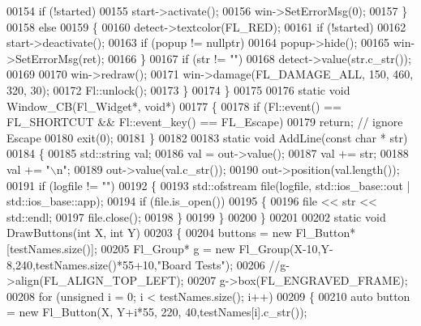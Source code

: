 \begin{DoxyCode}
00154             \textcolor{keywordflow}{if} (!started)
00155                 start->activate();
00156             win->SetErrorMsg(0);
00157         \}
00158         \textcolor{keywordflow}{else}
00159         \{
00160             detect->textcolor(FL\_RED);
00161             \textcolor{keywordflow}{if} (!started)
00162                 start->deactivate();
00163             \textcolor{keywordflow}{if} (popup != \textcolor{keyword}{nullptr})
00164                 popup->hide();
00165             win->SetErrorMsg(ret);
00166         \}
00167         \textcolor{keywordflow}{if} (str != \textcolor{stringliteral}{""})
00168             detect->value(str.c\_str());
00169 
00170         win->redraw();
00171         win->damage(FL\_DAMAGE\_ALL, 150, 460, 320, 30);
00172         Fl::unlock();
00173     \}
00174 \}
00175 
00176 \textcolor{keyword}{static} \textcolor{keywordtype}{void} Window\_CB(Fl\_Widget*, \textcolor{keywordtype}{void}*)
00177 \{
00178     \textcolor{keywordflow}{if} (Fl::event() == FL\_SHORTCUT && Fl::event\_key() == FL\_Escape)
00179         \textcolor{keywordflow}{return}; \textcolor{comment}{// ignore Escape}
00180     exit(0);
00181 \}
00182 
00183 \textcolor{keyword}{static} \textcolor{keywordtype}{void} AddLine(\textcolor{keyword}{const} \textcolor{keywordtype}{char} * str)
00184 \{
00185     std::string val;
00186     val = out->value();
00187     val += str;
00188     val += \textcolor{stringliteral}{"\(\backslash\)n"};
00189     out->value(val.c\_str());
00190     out->position(val.length());
00191     \textcolor{keywordflow}{if} (logfile != \textcolor{stringliteral}{""})
00192     \{
00193         std::ofstream file(logfile, std::ios\_base::out | std::ios\_base::app);
00194         \textcolor{keywordflow}{if} (file.is\_open())
00195         \{
00196             file << str << std::endl;
00197             file.close();
00198         \}
00199     \}
00200 \}
00201 
00202 \textcolor{keyword}{static} \textcolor{keywordtype}{void} DrawButtons(\textcolor{keywordtype}{int} X, \textcolor{keywordtype}{int} Y)
00203 \{
00204     buttons = \textcolor{keyword}{new} Fl\_Button*[testNames.size()];
00205     Fl\_Group* g = \textcolor{keyword}{new} Fl\_Group(X-10,Y-8,240,testNames.size()*55+10,\textcolor{stringliteral}{"Board Tests"});
00206     \textcolor{comment}{//g->align(FL\_ALIGN\_TOP\_LEFT);}
00207     g->box(FL\_ENGRAVED\_FRAME);
00208     \textcolor{keywordflow}{for} (\textcolor{keywordtype}{unsigned} i = 0; i < testNames.size(); i++)
00209     \{
00210         \textcolor{keyword}{auto} button = \textcolor{keyword}{new} Fl\_Button(X, Y+i*55, 220, 40,testNames[i].c\_str());

\end{DoxyCode}
